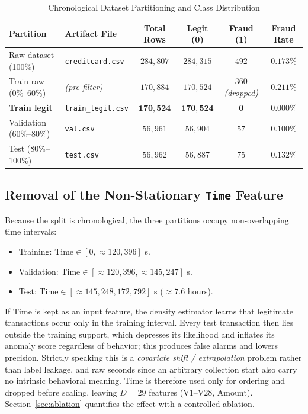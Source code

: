 \documentclass[conference]{IEEEtran}
\begin{document}
\begin{table}[!t]
\centering
\caption{Chronological Dataset Partitioning and Class Distribution}
\renewcommand{\arraystretch}{1.2}
\small
\begin{tabular}{llcccc}
\toprule
\textbf{Partition} & \textbf{Artifact File} & \textbf{Total Rows} & \textbf{Legit (0)} & \textbf{Fraud (1)} & \textbf{Fraud Rate} \\
\midrule
Raw dataset (100\%) & \texttt{creditcard.csv} & $284{,}807$ & $284{,}315$ & $492$ & $0.173\%$ \\
Train raw (0\%--60\%) & \textit{(pre-filter)} & $170{,}884$ & $170{,}524$ & $360$ \textit{(dropped)} & $0.211\%$ \\
\textbf{Train legit} & \texttt{train\_legit.csv} & $\mathbf{170{,}524}$ & $\mathbf{170{,}524}$ & $\mathbf{0}$ & $\mathbf{0.000\%}$ \\
Validation (60\%--80\%) & \texttt{val.csv} & $56{,}961$ & $56{,}904$ & $57$ & $0.100\%$ \\
Test (80\%--100\%) & \texttt{test.csv} & $56{,}962$ & $56{,}887$ & $75$ & $0.132\%$ \\
\bottomrule
\end{tabular}
\label{tab:splits}
\end{table}

\subsection{Removal of the Non-Stationary \texorpdfstring{\texttt{Time}}{Time} Feature}
\label{sec:time}
Because the split is chronological, the three partitions occupy non-overlapping time intervals:
\begin{itemize}
    \item Training: $\text{Time} \in [0, \approx 120{,}396]$ s.
    \item Validation: $\text{Time} \in [\approx 120{,}396, \approx 145{,}247]$ s.
    \item Test: $\text{Time} \in [\approx 145{,}248, 172{,}792]$ s ($\approx 7.6$ hours).
\end{itemize}
If $\text{Time}$ is kept as an input feature, the density estimator learns that legitimate transactions occur only in the training interval. Every test transaction then lies outside the training support, which depresses its likelihood and inflates its anomaly score regardless of behavior; this produces false alarms and lowers precision. Strictly speaking this is a \emph{covariate shift / extrapolation} problem rather than label leakage, and raw seconds since an arbitrary collection start also carry no intrinsic behavioral meaning. $\text{Time}$ is therefore used only for ordering and dropped before scaling, leaving $D = 29$ features ($\text{V1}$--$\text{V28}$, $\text{Amount}$). Section~\ref{sec:ablation} quantifies the effect with a controlled ablation.
\end{document}
